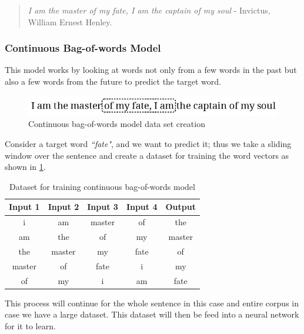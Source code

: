 \begin{quote}
    \textit{I am the master of my fate, I am the captain of my soul} - Invictus, William Ernest Henley.
\end{quote}

\subsubsection*{Continuous Bag-of-words Model}
This model works by looking at words not only from a few words in the past but also a few words from the future to predict the target word. 

\begin{figure}[!ht]
    \centering
    \includegraphics[width=12cm]{pics/bag-of-wordWord2Vec.jpg}
     \captionsetup{justification=centering,margin=2cm}
    \caption{Continuous bag-of-words model data set creation}
    
    \label{fig:word2VecBagOfWords}
\end{figure}

Consider a target word \textit{``fate"}, and we want to predict it; thus we take a sliding window over the sentence and create a dataset for training the word vectors as shown in \ref{fig:word2VecBagOfWords}. 

\begin{table}[!ht]
\centering
\begin{tabular}{ccccc}
\hline
\multicolumn{1}{l}{\textbf{Input 1}} & \multicolumn{1}{l}{\textbf{Input 2}} & \textbf{Input 3} & \multicolumn{1}{l}{\textbf{Input 4}} & \textbf{Output} \\ \hline
i & am & master & of & the \\ \hline
am & the & of & my & master \\ \hline
the & master & my & fate & of \\ \hline
master & of & fate & i & my \\ \hline
of & my & i & am & fate \\ \hline
\end{tabular}
\caption{Dataset for training continuous bag-of-words model}
 \captionsetup{justification=centering,margin=2cm}
\label{datasetBagOfWords}
\end{table}

This process will continue for the whole sentence in this case and entire corpus in case we have a large dataset. This dataset will then be feed into a neural network for it to learn. 

